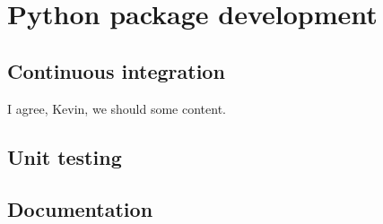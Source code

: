 \documentclass[]{book}
\begin{document}
\chapter{Python package development}\label{python-package-development}

\section{Continuous integration}\label{continuous-integration-1}

I agree, Kevin, we should some content.

\section{Unit testing}\label{unit-testing-1}

\section{Documentation}\label{documentation-1}


\end{document}
